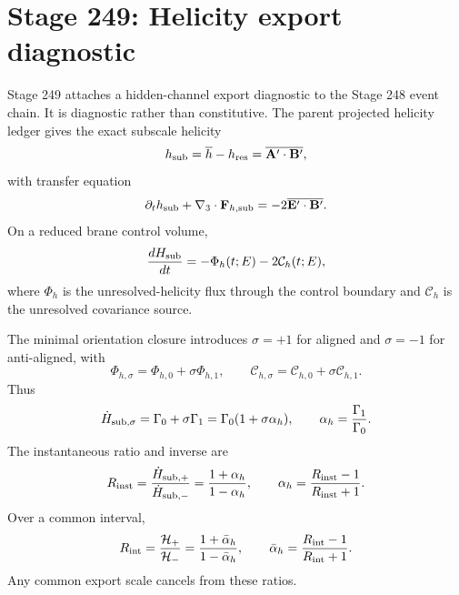 \section{Stage 249: Helicity export diagnostic}
\label{sec:app-part08:helicity-export-diagnostic}
\label{stage:249}


Stage 249 attaches a hidden-channel export diagnostic to the Stage 248 event chain.  It is diagnostic rather than constitutive.  The parent projected helicity ledger gives the exact subscale helicity
\begin{equation}
\label{eq:app-part08-stage249-hsub}
h_{\rm sub}
=
\overline h-h_{\rm res}
=
\overline{\mathbf A'\cdot\mathbf B'},
\end{equation}
with transfer equation
\begin{equation}
\label{eq:app-part08-stage249-hsub-eq}
\partial_th_{\rm sub}+\nabla_3\cdot\mathbf F_{h,{\rm sub}}
=
-2\overline{\mathbf E'\cdot\mathbf B'}.
\end{equation}
On a reduced brane control volume,
\begin{equation}
\label{eq:app-part08-stage249-hdot}
\frac{dH_{\rm sub}}{dt}
=
-\Phi_h(t;E)-2\mathcal C_h(t;E),
\end{equation}
where \(\Phi_h\) is the unresolved-helicity flux through the control boundary and \(\mathcal C_h\) is the unresolved covariance source.

The minimal orientation closure introduces \(\sigma=+1\) for aligned and \(\sigma=-1\) for anti-aligned, with
\begin{equation}
\label{eq:app-part08-stage249-orientation-closure}
\Phi_{h,\sigma}=\Phi_{h,0}+\sigma\Phi_{h,1},
\qquad
\mathcal C_{h,\sigma}=\mathcal C_{h,0}+\sigma\mathcal C_{h,1}.
\end{equation}
Thus
\begin{equation}
\label{eq:app-part08-stage249-export-rate}
\dot H_{{\rm sub},\sigma}
=\Gamma_0+\sigma\Gamma_1
=\Gamma_0(1+\sigma\alpha_h),
\qquad
\alpha_h=\frac{\Gamma_1}{\Gamma_0}.
\end{equation}
The instantaneous ratio and inverse are
\begin{equation}
\label{eq:app-part08-stage249-instant-ratio}
R_{\rm inst}=\frac{\dot H_{{\rm sub},+}}{\dot H_{{\rm sub},-}}
=\frac{1+\alpha_h}{1-\alpha_h},
\qquad
\alpha_h=\frac{R_{\rm inst}-1}{R_{\rm inst}+1}.
\end{equation}
Over a common interval,
\begin{equation}
\label{eq:app-part08-stage249-integrated-ratio}
R_{\rm int}
=\frac{\mathcal H_+}{\mathcal H_-}
=\frac{1+\bar\alpha_h}{1-\bar\alpha_h},
\qquad
\bar\alpha_h=\frac{R_{\rm int}-1}{R_{\rm int}+1}.
\end{equation}
Any common export scale cancels from these ratios.

